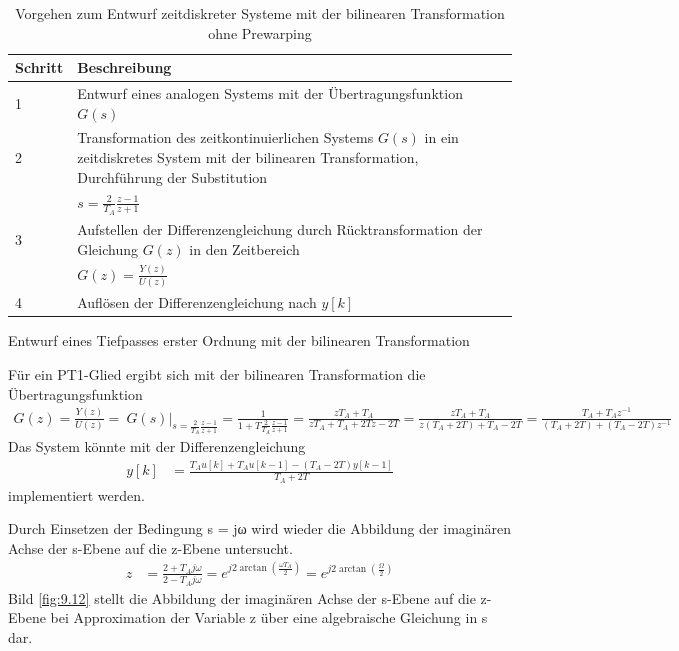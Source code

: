 \begin{table}
  \centering
  \caption{Vorgehen zum Entwurf zeitdiskreter Systeme mit der bilinearen Transformation ohne Prewarping}
  \label{tab:9.4}
  \begin{tabular}{ll}
    \toprule
    Schritt & Beschreibung \\
    \midrule
    1 & Entwurf eines analogen Systems mit der Übertragungsfunktion \(G(s)\) \\
    2 & Transformation des zeitkontinuierlichen Systems \(G(s)\) in ein zeitdiskretes System mit der bilinearen Transformation, Durchführung der Substitution \\
    & \(s = \frac{2}{T_{A}}  \frac{z - 1}{z + 1}\) \\
    3 & Aufstellen der Differenzengleichung durch Rücktransformation der Gleichung \(G(z)\) in den Zeitbereich \\
    & \(G(z) = \frac{Y(z)}{U(z)}\) \\
    4 & Auflösen der Differenzengleichung nach \(y[k]\) \\
    \bottomrule
  \end{tabular}
\end{table}

\begin{example}{Entwurf eines Tiefpasses erster Ordnung mit der bilinearen Transformation}
\label{example:beispiel-entwurf-eines-tiefpasses-erster-ordnung-mit-der-bilinearen-transformation}

Für ein PT1-Glied ergibt sich mit der bilinearen Transformation die Übertragungsfunktion
\begin{align*}
{G(z) = \frac{Y(z)}{U(z)} = \left. \ G(s) \right|_{s = \frac{2}{T_{A}}  \frac{z - 1}{z + 1}} = \frac{1}{1 + T  \frac{2}{T_{A}}  \frac{z - 1}{z + 1}} = \frac{z  T_{A} + T_{A}}{z  T_{A} + T_{A} + 2  T  z - 2  T}
}{= \frac{z  T_{A} + T_{A}}{z  \left( T_{A} + 2  T \right) + T_{A} - 2  T} = \frac{T_{A} + T_{A}  z^{- 1}}{\left( T_{A} + 2  T \right) + \left( T_{A} - 2  T \right)z^{- 1}}} 
\end{align*}
Das System könnte mit der Differenzengleichung
\begin{align*}
y[ k] &= \frac{T_{A}  u[ k] + T_{A}  u[ k - 1] - \left( T_{A} - 2  T \right)  y[ k - 1]}{T_{A} + 2  T} 
\end{align*}
implementiert werden.

\end{example}

Durch Einsetzen der Bedingung s = jω wird wieder die Abbildung der imaginären Achse der s-Ebene auf die z-Ebene untersucht.
\begin{align}
z &= \frac{2 + T_{A}  j  \omega}{2 - T_{A}  j  \omega} = e^{j  2  \arctan\left( \frac{\omega  T_{A}}{2} \right)} = e^{j  2  \arctan\left( \frac{\Omega}{2} \right)} \label{eq:9.61}
\end{align}
Bild \ref{fig:9.12} stellt die Abbildung der imaginären Achse der s-Ebene auf die z-Ebene bei Approximation der Variable z über eine algebraische Gleichung in s dar.

